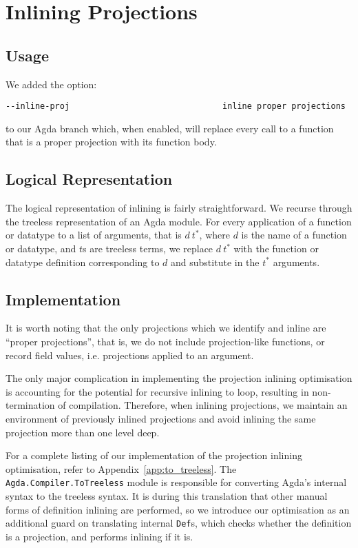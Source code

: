 \section{Inlining Projections}

\subsection{Usage}

We added the option:

\begin{verbatim}
--inline-proj                               inline proper projections
\end{verbatim}

to our Agda branch which, when enabled, will replace every call to a function that is a proper projection with its function body.

\subsection{Logical Representation}

The logical representation of inlining is fairly straightforward. We recurse through the treeless representation of an Agda module. For every application of a function or datatype to a list of arguments, that is $d~t^*$, where $d$ is the name of a function or datatype, and $t$s are treeless terms, we replace $d~t^*$ with the function or datatype definition corresponding to $d$ and substitute in the $t^*$ arguments.

\subsection{Implementation}

It is worth noting that the only projections which we identify and inline are ``proper projections'', that is, we do not include projection-like functions, or record field values, i.e. projections applied to an argument.

The only major complication in implementing the projection inlining optimisation is accounting for the potential for recursive inlining to loop, resulting in non-termination of compilation. Therefore, when inlining projections, we maintain an environment of previously inlined projections and avoid inlining the same projection more than one level deep.

For a complete listing of our implementation of the projection inlining optimisation, refer to Appendix~\ref{app:to_treeless}. The \lstinline{Agda.Compiler.ToTreeless} module is responsible for converting Agda's internal syntax to the treeless syntax. It is during this translation that other manual forms of definition inlining are performed, so we introduce our optimisation as an additional guard on translating internal \lstinline{Def}s, which checks whether the definition is a projection, and performs inlining if it  is.

